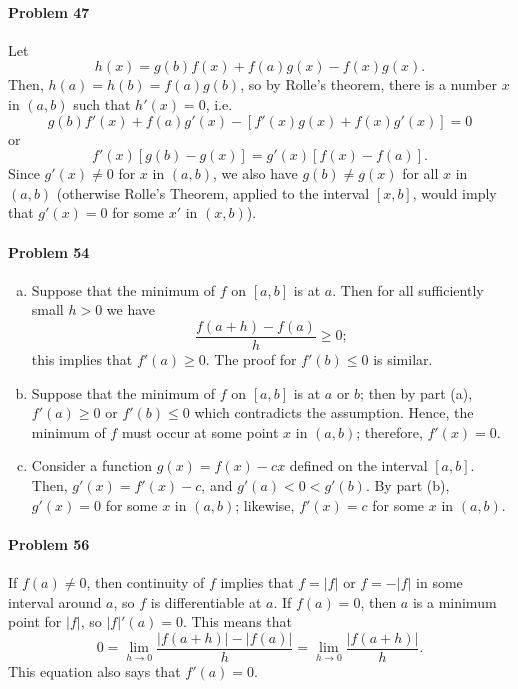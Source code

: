 \documentclass{article}
\begin{document}
\paragraph{Problem 47} Let \[
  h(x) = g(b)f(x) + f(a)g(x) - f(x)g(x).
\] Then, $h(a) = h(b) = f(a)g(b)$, so by Rolle's theorem, there is a number $x$
in $(a, b)$ such that $h'(x) = 0$, i.e. \[
  g(b)f'(x) + f(a)g'(x) - [f'(x)g(x) + f(x)g'(x)] = 0
\] or \[
  f'(x)[g(b) - g(x)] = g'(x)[f(x) - f(a)].
\] Since $g'(x) \neq 0$ for $x$ in $(a, b)$, we also have $g(b) \neq g(x)$ for
all $x$ in $(a, b)$ (otherwise Rolle's Theorem, applied to the interval $[x,
b]$, would imply that $g'(x) = 0$ for some $x'$ in $(x, b)$).

\paragraph{Problem 54}
\begin{enumerate}[(a)]
  \item Suppose that the minimum of $f$ on $[a, b]$ is at $a$. Then for all
    sufficiently small $h > 0$ we have \[
      \frac{f(a + h) - f(a)}{h} \geq 0;
    \] this implies that $f'(a) \geq 0$. The proof for $f'(b) \leq 0$ is
    similar.
  \item Suppose that the minimum of $f$ on $[a, b]$ is at $a$ or $b$; then by
    part (a), $f'(a) \geq 0$ or $f'(b) \leq 0$ which contradicts the
    assumption. Hence, the minimum of $f$ must occur at some point $x$ in $(a,
    b)$; therefore, $f'(x) = 0$.
  \item Consider a function $g(x) = f(x) - cx$ defined on the interval $[a,
    b]$. Then, $g'(x) = f'(x) - c$, and $g'(a) < 0 < g'(b)$. By part (b),
    $g'(x) = 0$ for some $x$ in $(a, b)$; likewise, $f'(x) = c$ for some $x$ in
    $(a, b)$.
\end{enumerate}

\paragraph{Problem 56} If $f(a) \neq 0$, then continuity of $f$ implies that $f
= |f|$ or $f = -|f|$ in some interval around $a$, so $f$ is differentiable
at $a$. If $f(a) = 0$, then $a$ is a minimum point for $|f|$, so $|f|'(a) = 0$.
This means that \[
  0
  = \lim_{h \to 0} \frac{|f(a + h)| - |f(a)|}{h}
  = \lim_{h \to 0} \frac{|f(a + h)|}{h}.
\] This equation also says that $f'(a) = 0$.
\end{document}
